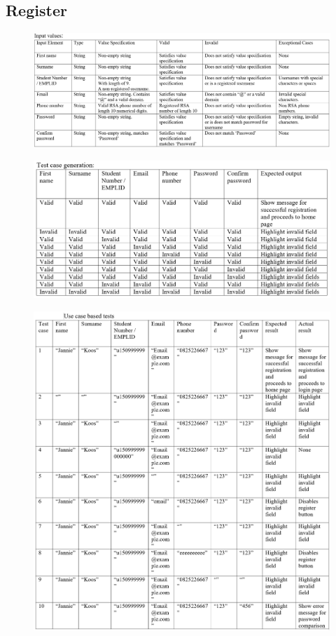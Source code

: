 \documentclass[english]{article}
\begin{document}
\subsection{Register}
\begin{figure}[H]
    \label{tab:example}
\hspace*{-2.5cm} 
\includegraphics[width=180mm]{5.png}
\end{figure}
\begin{figure}[H]
\hspace*{-2.5cm} 
\includegraphics[width=180mm]{6.png}
\end{figure}
\begin{figure}[H]
\hspace*{-2.5cm} 
\includegraphics[width=180mm]{7.png}
\end{figure}
\end{document}
